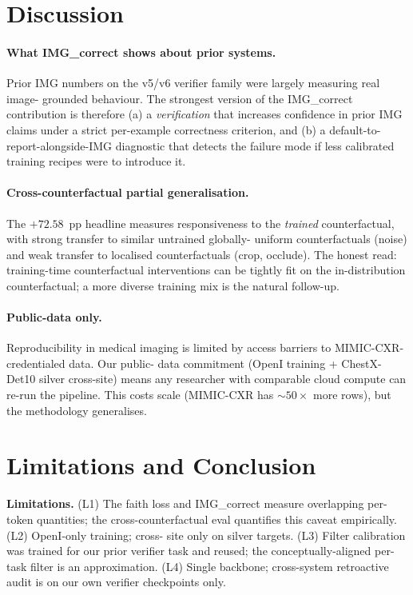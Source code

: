 \documentclass{article}
\begin{document}
\section{Discussion}

\paragraph{What IMG\_correct shows about prior systems.} Prior IMG
numbers on the v5/v6 verifier family were largely measuring real image-
grounded behaviour. The strongest version of the IMG\_correct
contribution is therefore (a) a \emph{verification} that increases
confidence in prior IMG claims under a strict per-example correctness
criterion, and (b) a default-to-report-alongside-IMG diagnostic that
detects the failure mode if less calibrated training recipes were to
introduce it.

\paragraph{Cross-counterfactual partial generalisation.} The $+72.58$
\,pp headline measures responsiveness to the \emph{trained}
counterfactual, with strong transfer to similar untrained globally-
uniform counterfactuals (noise) and weak transfer to localised
counterfactuals (crop, occlude). The honest read: training-time
counterfactual interventions can be tightly fit on the in-distribution
counterfactual; a more diverse training mix is the natural follow-up.

\paragraph{Public-data only.} Reproducibility in medical imaging is
limited by access barriers to MIMIC-CXR-credentialed data. Our public-
data commitment (OpenI training + ChestX-Det10 silver cross-site) means
any researcher with comparable cloud compute can re-run the pipeline.
This costs scale (MIMIC-CXR has $\sim 50\times$ more rows), but the
methodology generalises.

\section{Limitations and Conclusion}

\textbf{Limitations.} (L1) The faith loss and IMG\_correct measure
overlapping per-token quantities; the cross-counterfactual eval
quantifies this caveat empirically. (L2) OpenI-only training; cross-
site only on silver targets. (L3) Filter calibration was trained for our
prior verifier task and reused; the conceptually-aligned per-task
filter is an approximation. (L4) Single backbone; cross-system
retroactive audit is on our own verifier checkpoints only.
\end{document}

